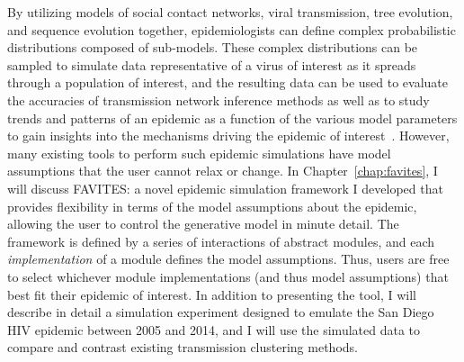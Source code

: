 By utilizing models of social contact networks, viral transmission, tree evolution, and sequence evolution together, epidemiologists can define complex probabilistic distributions composed of sub-models. These complex distributions can be sampled to simulate data representative of a virus of interest as it spreads through a population of interest, and the resulting data can be used to evaluate the accuracies of transmission network inference methods as well as to study trends and patterns of an epidemic as a function of the various model parameters to gain insights into the mechanisms driving the epidemic of interest~\cite{Ratmann2017}. However, many existing tools to perform such epidemic simulations have model assumptions that the user cannot relax or change. In Chapter~\ref{chap:favites}, I will discuss FAVITES: a novel epidemic simulation framework I developed that provides flexibility in terms of the model assumptions about the epidemic, allowing the user to control the generative model in minute detail. The framework is defined by a series of interactions of abstract modules, and each \textit{implementation} of a module defines the model assumptions. Thus, users are free to select whichever module implementations (and thus model assumptions) that best fit their epidemic of interest. In addition to presenting the tool, I will describe in detail a simulation experiment designed to emulate the San Diego \gls{HIV} epidemic between 2005 and 2014, and I will use the simulated data to compare and contrast existing transmission clustering methods.

